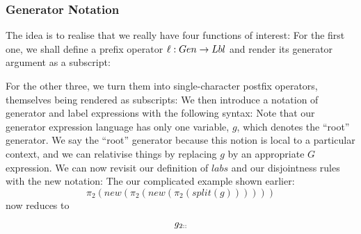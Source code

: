 \subsubsection{Generator Notation}

The idea is to realise that we really have four functions of interest:
For the first one, we shall define a prefix operator $\ell : Gen \rightarrow Lbl$
and render its generator argument as a subscript:

For the other three, we turn them into single-character postfix operators,
themselves being rendered as subscripts:
We then introduce a notation of generator and label expressions
with the following syntax:
Note that our generator expression language has only one variable, $g$,
which denotes the ``root'' generator.
We say the  ``root'' generator because this notion is local to a
particular context, and we can relativise things by replacing $g$
by an appropriate $G$ expression.
We can now revisit our definition of $labs$ and our disjointness rules
with the new notation:
The our complicated example shown earlier:
\[
\pi_2(new(\pi_2(new(\pi_2(split(g))))))
\]
now reduces to
\[
  g_{2::}
\]


